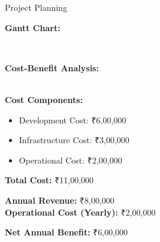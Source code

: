 \documentclass[11pt]{beamer}
\begin{document}
\begin{frame}[t, allowframebreaks]{Project Planning}
        \framebreak

        \textbf{\large Gantt Chart:}

        \\[20pt]

        \framebreak

        \textbf{\large Cost-Benefit Analysis:}

        \\[10pt]

        \textbf{Cost Components:}
        \begin{itemize}
            \item Development Cost: ₹6,00,000
            \item Infrastructure Cost: ₹3,00,000
            \item Operational Cost: ₹2,00,000
        \end{itemize}

        \vspace{0.3cm}

        \textbf{Total Cost:} ₹11,00,000

        \vspace{0.5cm}

        \textbf{Annual Revenue:} ₹8,00,000 \\
        \textbf{Operational Cost (Yearly):} ₹2,00,000 \\

        \vspace{0.3cm}

        \textbf{Net Annual Benefit:} ₹6,00,000


\end{frame}
\end{document}
